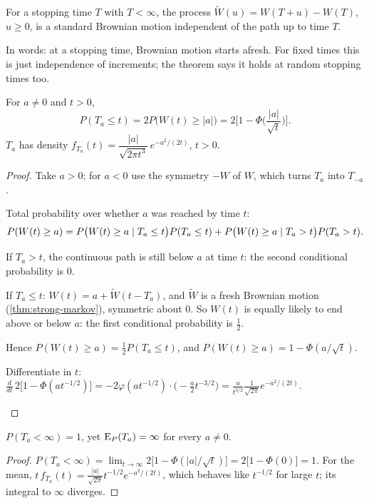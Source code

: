 \begin{theorem}
\label{thm:strong-markov}
For a stopping time $T$ with $T<\infty$, the process $\tilde W(u)=W(T+u)-W(T)$, $u\ge0$, is a standard Brownian motion independent of the path up to time $T$.
\end{theorem}
\noproof

In words: at a stopping time, Brownian motion starts afresh. For fixed times this is just independence of increments; the theorem says it holds at random stopping times too.

\begin{theorem}[Distribution of $T_a$]
\label{thm:Ta}
For $a\ne0$ and $t>0$,
\[
  P(T_a\le t)=2P\big(W(t)\ge|a|\big)=2\Big[1-\Phi\Big(\frac{|a|}{\sqrt t}\Big)\Big].
\]
$T_a$ has density $f_{T_a}(t)=\dfrac{|a|}{\sqrt{2\pi t^3}}\,e^{-a^2/(2t)}$, $t>0$.
\end{theorem}
\begin{proof}
Take $a>0$; for $a<0$ use the symmetry $-W$ of $W$, which turns $T_a$ into $T_{-a}$.
\begin{steps}
  \item Total probability over whether $a$ was reached by time $t$:
  \[
    P(W(t)\ge a)=P\big(W(t)\ge a\mid T_a\le t\big)P(T_a\le t)+P\big(W(t)\ge a\mid T_a>t\big)P(T_a>t).
  \]
  \item If $T_a>t$, the continuous path is still below $a$ at time $t$: the second conditional probability is $0$.
  \item If $T_a\le t$: $W(t)=a+\tilde W(t-T_a)$, and $\tilde W$ is a fresh Brownian motion (\cref{thm:strong-markov}), symmetric about $0$. So $W(t)$ is equally likely to end above or below $a$: the first conditional probability is $\frac12$.
  \item Hence $P(W(t)\ge a)=\frac12P(T_a\le t)$, and $P(W(t)\ge a)=1-\Phi(a/\sqrt t)$.
  \item Differentiate in $t$: $\frac{d}{dt}\,2\big[1-\Phi(at^{-1/2})\big]=-2\varphi(at^{-1/2})\cdot\big(-\frac a2t^{-3/2}\big)=\frac{a}{t^{3/2}}\frac{1}{\sqrt{2\pi}}e^{-a^2/(2t)}$. \qedhere
\end{steps}
\end{proof}

\begin{result}
\label{res:Ta-finite}
$P(T_a<\infty)=1$, yet $\operatorname{E}_P(T_a)=\infty$ for every $a\ne0$.
\end{result}
\begin{proof}
$P(T_a<\infty)=\lim_{t\to\infty}2\big[1-\Phi(|a|/\sqrt t)\big]=2\big[1-\Phi(0)\big]=1$. For the mean, $t\,f_{T_a}(t)=\frac{|a|}{\sqrt{2\pi}}t^{-1/2}e^{-a^2/(2t)}$, which behaves like $t^{-1/2}$ for large $t$; its integral to $\infty$ diverges.
\end{proof}

